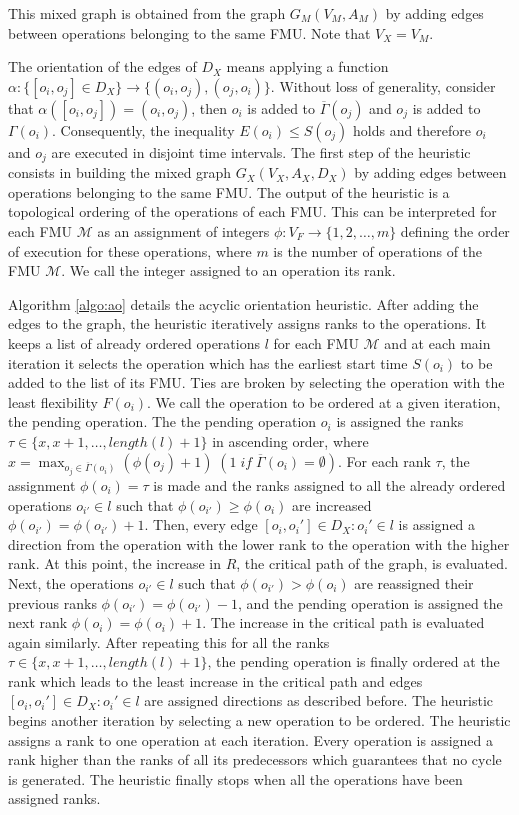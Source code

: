 This mixed graph is obtained from the graph $G_M(V_M,A_M)$ by adding edges between operations belonging to the same FMU. Note that $V_X = V_M$.

The orientation of the edges of $D_X$ means applying a function $\alpha :  \{[o_i,o_j] \in D_X\} \rightarrow \{(o_i,o_j),(o_j,o_i)\}$. Without loss of generality, consider that $\alpha([o_i,o_j]) = (o_i,o_j)$, then $o_i$ is added to $\overline{\Gamma}(o_j)$ and $o_j$ is added to $\Gamma(o_i)$. Consequently, the inequality $E(o_i) \leq S(o_j)$ holds and therefore $o_i$ and $o_j$ are executed in disjoint time intervals. The first step of the heuristic consists in building the mixed graph $G_X(V_X,A_X,D_X)$ by adding edges between operations belonging to the same FMU. The output of the heuristic is a topological ordering of the operations of each FMU. This can be interpreted for each FMU $\mathcal{M}$ as an assignment of integers $\phi : V_F \rightarrow \{1,2, \dots ,m\}$ defining the order of execution for these operations, where $m$ is the number of operations of the FMU $\mathcal{M}$. We call the integer assigned to an operation its rank.

Algorithm \ref{algo:ao} details the acyclic orientation heuristic. After adding the edges to the graph, the heuristic iteratively assigns ranks to the operations. It keeps a list of already ordered operations $l$ for each FMU $\mathcal{M}$ and at each main iteration it selects the operation which has the earliest start time $S(o_i)$ to be added to the list of its FMU. Ties are broken by selecting the operation with the least flexibility $F(o_i)$. We call the operation to be ordered at a given iteration, the pending operation. The the pending operation $o_i$ is assigned the ranks $\tau \in \{x,x+1, \dots ,length(l)+1\}$ in ascending order, where \mbox{$x = \max_{o_j \in {\overline{\Gamma}}(o_i)}(\phi(o_j)+1)\; (1 \; if \; {\overline{\Gamma}}(o_i) = \emptyset)$}. For each rank $\tau$, the assignment $\phi(o_i)=\tau$ is made and the ranks assigned to all the already ordered operations $o_{i'} \in l$ such that $\phi(o_{i'}) \geq \phi(o_{i})$ are increased $\phi(o_{i'}) = \phi(o_{i'})+1$. Then, every edge $[o_i,o_i'] \in D_X : o_i' \in l$ is assigned a direction from the operation with the lower rank to the operation with the higher rank. At this point, the increase in $R$, the critical path of the graph, is evaluated. Next, the operations $o_{i'} \in l$ such that $\phi(o_{i'}) > \phi(o_{i})$ are reassigned their previous ranks $\phi(o_{i'}) = \phi(o_{i'})-1$, and the pending operation is assigned the next rank $\phi(o_i)=\phi(o_i)+1$. The increase in the critical path is evaluated again similarly. After repeating this for all the ranks $\tau \in \{x,x+1, \dots ,length(l)+1\}$, the pending operation is finally ordered at the rank which leads to the least increase in the critical path and edges $[o_i,o_i'] \in D_X : o_i' \in l$ are assigned directions as described before. The heuristic begins another iteration by selecting a new operation to be ordered. The heuristic assigns a rank to one operation at each iteration. Every operation is assigned a rank higher than the ranks of all its predecessors which guarantees that no cycle is generated. The heuristic finally stops when all the operations have been assigned ranks.

